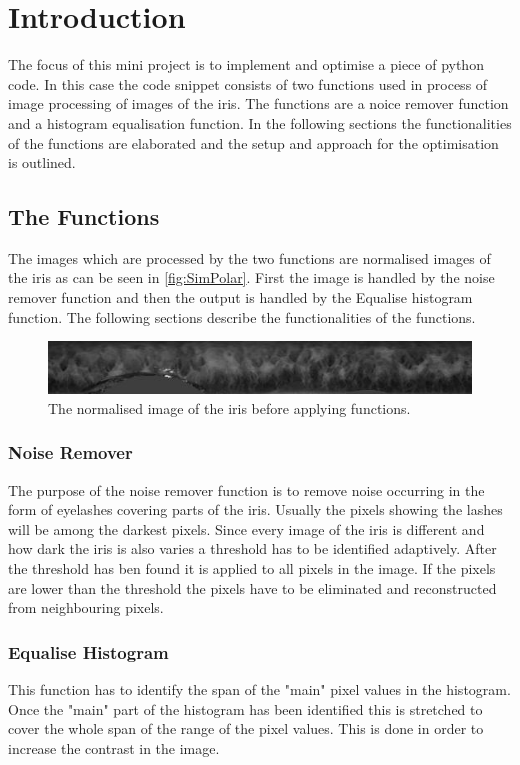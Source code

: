 \chapter{Introduction}
The focus of this mini project is to implement and optimise a piece of python code. 
In this case the code snippet consists of two functions used in process of image processing of images of the iris. The functions are a noice remover function and a histogram equalisation function. In the following sections the functionalities of the functions are elaborated and the setup and approach for the optimisation is outlined. 

\section{The Functions}
\label{sec:The_Functions}
The images which are processed by the two functions are normalised images of the iris as can be seen in \autoref{fig:SimPolar}. First the image is handled by the noise remover function and then the output is handled by the Equalise histogram function. The following sections describe the functionalities of the functions. 
\begin{figure}[h]
\centering
\includegraphics[width=\textwidth]{figures/002polar.jpg}
\caption{The normalised image of the iris before applying functions.}
\label{fig:SimPolar}
\end{figure}


\subsection{Noise Remover}
The purpose of the noise remover function is to remove noise occurring in the form of eyelashes covering parts of the iris. Usually the pixels showing the lashes will be among the darkest pixels. Since every image of the iris is different and how dark the iris is also varies a threshold has to be identified adaptively. After the threshold has ben found it is applied to all pixels in the image. If the pixels are lower than the threshold the pixels have to be eliminated and reconstructed from neighbouring pixels.
  
\subsection{Equalise Histogram}
This function has to identify the span of the "main" pixel values in the histogram. Once the "main" part of the  histogram has been identified this is stretched to cover the whole span of the range of the pixel values. This is done in order to increase the contrast in the image.  


